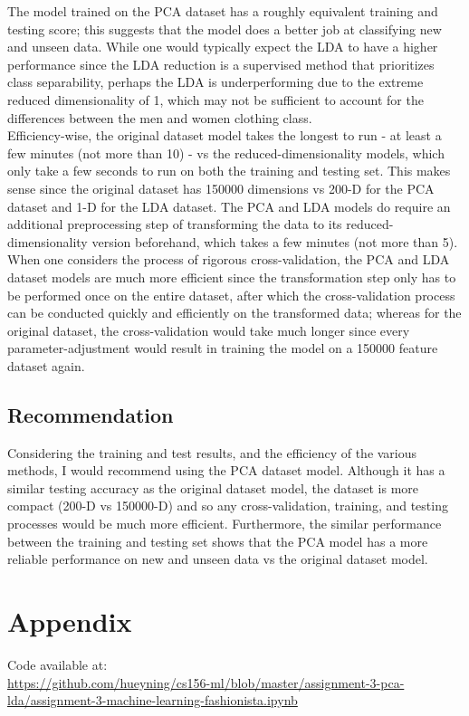 \documentclass[11pt]{article}
\begin{document}
The model trained on the PCA dataset has a roughly equivalent training
and testing score; this suggests that the model does a better job at
classifying new and unseen data. While one would typically expect the
LDA to have a higher performance since the LDA reduction is a supervised
method that prioritizes class separability, perhaps the LDA is
underperforming due to the extreme reduced dimensionality of 1, which
may not be sufficient to account for the differences between the men and
women clothing class.\\

Efficiency-wise, the original dataset model takes the longest to run -
at least a few minutes (not more than 10) - vs the
reduced-dimensionality models, which only take a few seconds to run on
both the training and testing set. This makes sense since the original
dataset has 150000 dimensions vs 200-D for the PCA dataset and 1-D for
the LDA dataset. The PCA and LDA models do require an additional
preprocessing step of transforming the data to its
reduced-dimensionality version beforehand, which takes a few minutes
(not more than 5).\\

When one considers the process of rigorous cross-validation, the PCA and
LDA dataset models are much more efficient since the transformation step
only has to be performed once on the entire dataset, after which the
cross-validation process can be conducted quickly and efficiently on the
transformed data; whereas for the original dataset, the cross-validation
would take much longer since every parameter-adjustment would result in
training the model on a 150000 feature dataset again.

\subsection{Recommendation}

Considering the training and test results, and the efficiency of the
various methods, I would recommend using the PCA dataset model. Although
it has a similar testing accuracy as the original dataset model, the
dataset is more compact (200-D vs 150000-D) and so any cross-validation,
training, and testing processes would be much more efficient.
Furthermore, the similar performance between the training and testing
set shows that the PCA model has a more reliable performance on new and
unseen data vs the original dataset model.\newpage

   \section{Appendix}
   Code available at:\\
   \url{ https://github.com/hueyning/cs156-ml/blob/master/assignment-3-pca-lda/assignment-3-machine-learning-fashionista.ipynb}
    
    
    
\end{document}
